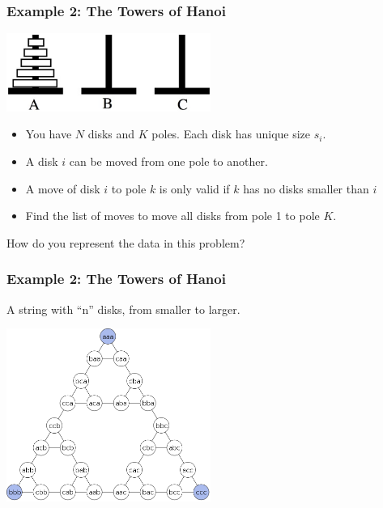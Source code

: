 \begin{frame}
  \frametitle{Example 2: The Towers of Hanoi}

  \begin{center}
    \includegraphics[width=0.5\textwidth]{img/hanoi}
  \end{center}
  \medskip

  {\small
    \begin{itemize}
    \item You have $N$ disks and $K$ poles. Each disk has unique size $s_i$.
    \item A disk $i$ can be moved from one pole to another.
    \item A move of disk $i$ to pole $k$ is only valid if $k$ has no disks smaller than $i$
    \item Find the list of moves to move all disks from pole 1 to pole $K$.
    \end{itemize}
  }

  \vfill

  How do you represent the data in this problem?
\end{frame}

\begin{frame}
  \frametitle{Example 2: The Towers of Hanoi}
  A string with ``n'' disks, from smaller to larger.
  \begin{center}
    \includegraphics[width=0.5\textwidth]{img/hanoi_graph}
  \end{center}
\end{frame}

